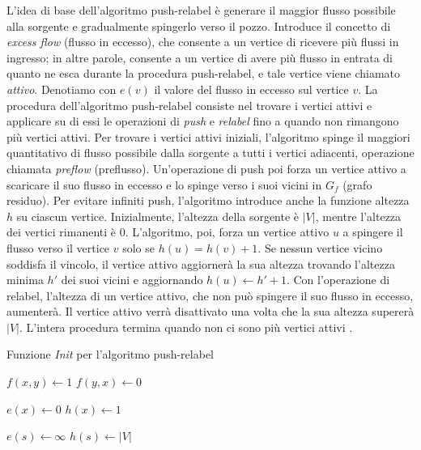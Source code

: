         L'idea di base dell'algoritmo push-relabel è generare il maggior flusso possibile alla sorgente e gradualmente spingerlo verso il pozzo. Introduce il concetto di \textit{excess flow} (flusso in eccesso), che consente a un vertice di ricevere più flussi in ingresso; in altre parole, consente a un vertice di avere più flusso in entrata di quanto ne esca durante la procedura push-relabel, e tale vertice viene chiamato \textit{attivo}. Denotiamo con $e(v)$ il valore del flusso in eccesso sul vertice $v$. La procedura dell'algoritmo push-relabel consiste nel trovare i vertici attivi e applicare su di essi le operazioni di \textit{push} e \textit{relabel} fino a quando non rimangono più vertici attivi. Per trovare i vertici attivi iniziali, l'algoritmo spinge il maggiori quantitativo di flusso possibile dalla sorgente a tutti i vertici adiacenti, operazione chiamata \textit{preflow} (preflusso). Un'operazione di push poi forza un vertice attivo a scaricare il suo flusso in eccesso e lo spinge verso i suoi vicini in $G_f$ (grafo residuo). Per evitare infiniti push, l'algoritmo introduce anche la funzione altezza $h$ su ciascun vertice. Inizialmente, l'altezza della sorgente è $|V|$, mentre l'altezza dei vertici rimanenti è 0. L'algoritmo, poi, forza un vertice attivo $u$ a spingere il flusso verso il vertice $v$ solo se $h(u) = h(v) + 1$. Se nessun vertice vicino soddisfa il vincolo, il vertice attivo aggiornerà la sua altezza trovando l'altezza minima $h'$ dei suoi vicini e aggiornando $h(u) \leftarrow h' + 1$. Con l'operazione di relabel, l'altezza di un vertice attivo, che non può spingere il suo flusso in eccesso, aumenterà. Il vertice attivo verrà disattivato una volta che la sua altezza supererà $|V|$. L'intera procedura termina quando non ci sono più vertici attivi \cite{EngineeringWorkload2024}.

        \begin{algorithm}
            \caption{Funzione \textit{Init} per l'algoritmo push-relabel}\label{alg:cap}
            \begin{algorithmic}
                \State $f(x,y) \gets 1$
                \State $f(y,x) \gets 0$
            \EndFor

                \State $e(x) \gets 0$
                \State $h(x) \gets 1$
            \EndFor
            
            \State $e(s) \gets \infty$
            \State $h(s) \gets |V|$
            
            \end{algorithmic}
        \end{algorithm}

